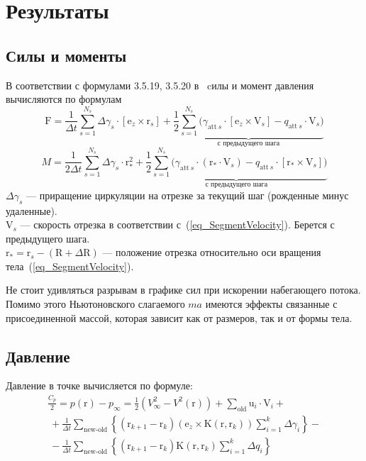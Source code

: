 \documentclass[14pt]{extreport}
\newcommand{\br}[1]{\boldsymbol{\mathrm{#1}}}
\renewcommand{\vec}[1]{\br{#1}}
\newcommand{\att}{\text{att}}
\begin{document}

\section{Результаты}
\subsection{Силы и моменты}

В соответствии с формулами 3.5.19, 3.5.20 в~\cite{vvd_book} cилы и момент давления вычисляются по формулам
\begin{equation}
\label{eq_force}
{\vec F} =
\frac{1}{\Delta t} \sum\limits_{s=1}^{N_s} {\Delta \gamma_s \cdot [\vec e_z \times \vec r_s]}
+
\underbrace {
	\frac{1}{2} \sum\limits_{s=1}^{N_s} \bigl(
		{\gamma_{\att~s} \cdot [\vec e_z \times \vec V_s]}
		- {q_{\att~s} \cdot \vec V_s }
	\bigr)
}_{\text{с предыдущего шага}}
\end{equation}
%
\begin{equation}
\label{eq_moment}
M =
\frac{1}{2\Delta t}\sum\limits_{s=1}^{N_s} { \Delta \gamma_s \cdot \vec r_*^2 }
+
\underbrace {
	\frac{1}{2} \sum\limits_{s=1}^{N_s} \bigl(
		{\gamma_{\att~s} \cdot(\vec r_* \cdot \vec V_s)
		- q_{\att~s} \cdot [\vec r_* \times \vec V_s]}
	\bigr)
}_{\text{с предыдущего шага}}
\end{equation}
%
$\Delta \gamma_s$ --- приращение циркуляции на отрезке за текущий шаг (рожденные минус удаленные).\\
$\vec V_s$ --- скорость отрезка в соответствии с~(\ref{eq_SegmentVelocity}). Берется с предыдущего шага.\\
$\vec r_* = \vec r_s - (\vec R + \Delta \vec R)$ --- положение отрезка относительно оси вращения тела~(\ref{eq_SegmentVelocity}).

Не стоит удивляться разрывам в графике сил при искорении набегающего потока. Помимо этого Ньютоновского слагаемого $ma$ имеются эффекты связанные с присоединенной массой, которая зависит как от размеров, так и от формы тела.

\subsection{Давление}
Давление в точке вычисляется по формуле:
\begin{multline*}
\frac{C_p}{2} = p(\br r) - p_\infty = \frac{1}{2} \left( V^2_\infty - V^2(\br r) \right) 
+\sum\limits_\text{old}{\br u_i \cdot \br V_i} + \\
\
+\frac{1}{\Delta t}\sum\limits_\text{new-old}
{\left\lbrace\left( \br r_{k+1} - \br r_k \right)\left( \br e_z \times \br K(\br r, \br r_k) \right)
\sum_{i=1}^k{\Delta\gamma_i}\right\rbrace} - \\
\
- \frac{1}{\Delta t}\sum\limits_\text{new-old}
{\left\lbrace\left( \br r_{k+1} - \br r_k \right)
\br K(\br r, \br r_k) \sum_{i=1}^k{\Delta q_i}\right\rbrace}
\end{multline*}
\end{document}
